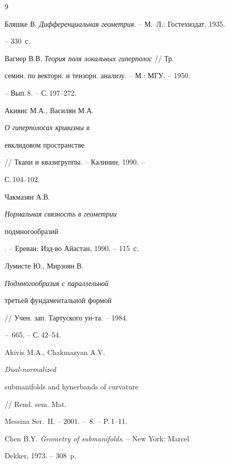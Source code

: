 \begin{thebibliography}{9}







Бляшке В. {\em Дифференциальная геометрия}. -- М.--Л.: Гостехиздат, 1935.


-- 330~с.




Вагнер В.В. {\em Теория поля локальных гиперполос} // Тр.


семин. по векторн. и тензорн. анализу. -- М.: МГУ. -- 1950.


-- Вып.\,8. -- С.\,197--272.




Акивис М.А., Василян М.А. {\em О гиперполосах кривизны в


евклидовом пространстве} // Ткани и квазигруппы. -- Калинин, 1990. --


С.\,104--102.




Чакмазян А.В. {\em Нормальная связность в геометрии


подмногообразий}. -- Ереван: Изд-во Айастан, 1990. -- 115~с.




Лумисте Ю., Мирзоян В. {\em Подмногообразия с параллельной


третьей фундаментальной формой} // Учен. зап. Тартуского ун-та. -- 1984.


-- \No\,665. -- С.\,42--54. 




Akivis M.A., Chakmazyan A.V. {\em Dual-normalized


submanifolds and hynerbands of curvature} // Rend. sem. Mat.


Messina Ser.~II. -- 2001. -- \No\,8. -- P.\,1--11.




Chen B.Y. {\em Geometry of submanifolds}. -- New York: Marcel


Dekker, 1973. -- 308~p.





\end{thebibliography}





\vskip 2cm












\label{end}





